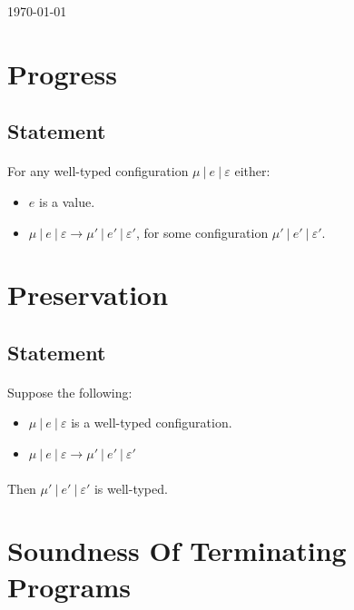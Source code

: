 \documentclass{llncs}
\begin{document}
\today

\section{Progress}

\subsection{Statement}

\paragraph{}
For any well-typed configuration $\mu~|~e~|~\varepsilon$ either:
\begin{itemize}
	\item $e$ is a value.
	\item $\mu~|~e~|~\varepsilon \longrightarrow \mu'~|~e'~|~\varepsilon'$, for some configuration $\mu'~|~e'~|~\varepsilon'$.
\end{itemize}

\section{Preservation}

\subsection{Statement}

\paragraph{}
Suppose the following:
\begin{itemize}
	\item $\mu~|~e~|~\varepsilon$ is a well-typed configuration.
	\item $\mu~|~e~|~\varepsilon \longrightarrow \mu'~|~e'~|~\varepsilon'$
\end{itemize}

\paragraph{}
Then $\mu'~|~e'~|~\varepsilon'$ is well-typed.

\section{Soundness Of Terminating Programs}
\end{document}
